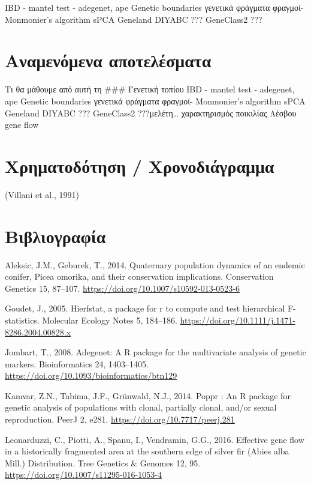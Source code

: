 \documentclass[12pt,a4paper,]{report}
\begin{document}
IBD - mantel test - adegenet, ape Genetic boundaries γενετικά φράγματα
φραγμοί- Monmonier's algorithm sPCA Geneland DIYABC ??? GeneClass2 ???

\hypertarget{-}{%
\section{Αναμενόμενα αποτελέσματα}\label{-}}

Τι θα μάθουμε από αυτή τη \#\#\# Γενετική τοπίου IBD - mantel test -
adegenet, ape Genetic boundaries γενετικά φράγματα φραγμοί- Monmonier's
algorithm sPCA Geneland DIYABC ??? GeneClass2 ???μελέτη\ldots{}
χαρακτηρισμός ποικιλίας Λέσβου gene flow

\hypertarget{-}{%
\section{Χρηματοδότηση / Χρονοδιάγραμμα}\label{-}}

(Villani et al., 1991)

\section{Βιβλιογραφία}

\hypertarget{refs}{}
\leavevmode\hypertarget{ref-Aleksic2014}{}%
Aleksic, J.M., Geburek, T., 2014. Quaternary population dynamics of an
endemic conifer, Picea omorika, and their conservation implications.
Conservation Genetics 15, 87--107.
\url{https://doi.org/10.1007/s10592-013-0523-6}

\leavevmode\hypertarget{ref-goudet_hierfstat_2005}{}%
Goudet, J., 2005. Hierfstat, a package for r to compute and test
hierarchical F-statistics. Molecular Ecology Notes 5, 184--186.
\url{https://doi.org/10.1111/j.1471-8286.2004.00828.x}

\leavevmode\hypertarget{ref-Jombart2008}{}%
Jombart, T., 2008. Adegenet: A R package for the multivariate analysis
of genetic markers. Bioinformatics 24, 1403--1405.
\url{https://doi.org/10.1093/bioinformatics/btn129}

\leavevmode\hypertarget{ref-Kamvar2014}{}%
Kamvar, Z.N., Tabima, J.F., Grünwald, N.J., 2014. Poppr : An R package
for genetic analysis of populations with clonal, partially clonal,
and/or sexual reproduction. PeerJ 2, e281.
\url{https://doi.org/10.7717/peerj.281}

\leavevmode\hypertarget{ref-Leonarduzzi2016a}{}%
Leonarduzzi, C., Piotti, A., Spanu, I., Vendramin, G.G., 2016. Effective
gene flow in a historically fragmented area at the southern edge of
silver fir (Abies alba Mill.) Distribution. Tree Genetics \& Genomes 12,
95. \url{https://doi.org/10.1007/s11295-016-1053-4}
\end{document}
